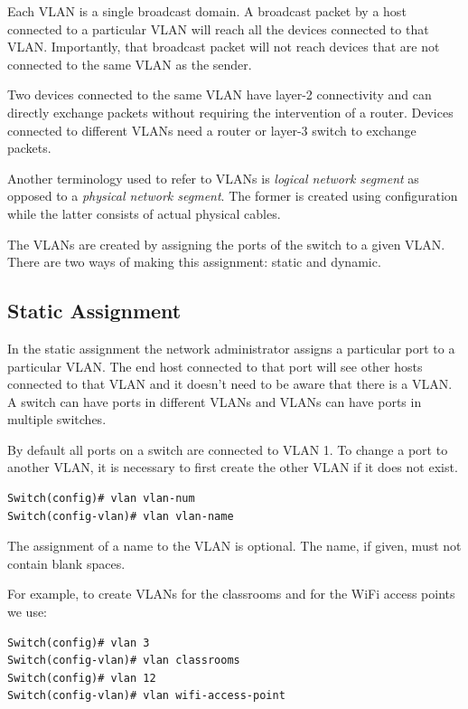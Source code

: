 Each VLAN is a single broadcast domain.
A broadcast packet by a host connected to a particular VLAN will reach all the devices connected to that VLAN.
Importantly, that broadcast packet will not reach devices that are not connected to the same VLAN as the sender.

Two devices connected to the same VLAN have layer-2 connectivity and can directly exchange packets without requiring the intervention of a router.
Devices connected to different VLANs need a router or layer-3 switch to exchange packets.

Another terminology used to refer to VLANs is \emph{logical network segment} as opposed to a \emph{physical network segment}.
The former is created using configuration while the latter consists of actual physical cables.

The VLANs are created by assigning the ports of the switch to a given VLAN.
There are two ways of making this assignment: static and dynamic.

\subsection{Static Assignment}

In the static assignment the network administrator assigns a particular port to a particular VLAN.
The end host connected to that port will see other hosts connected to that VLAN and it doesn't need to be aware that there is a VLAN.
A switch can have ports in different VLANs and VLANs can have ports in multiple switches.

By default all ports on a switch are connected to VLAN 1.
To change a port to another VLAN, it is necessary to first create the other VLAN if it does not exist.

\begin{lstlisting}
Switch(config)# vlan vlan-num
Switch(config-vlan)# vlan vlan-name
\end{lstlisting}

The assignment of a name to the VLAN is optional.
The name, if given, must not contain blank spaces.

For example, to create VLANs for the classrooms and for the WiFi access points we use:

\begin{lstlisting}
Switch(config)# vlan 3
Switch(config-vlan)# vlan classrooms
Switch(config)# vlan 12
Switch(config-vlan)# vlan wifi-access-point
\end{lstlisting}

